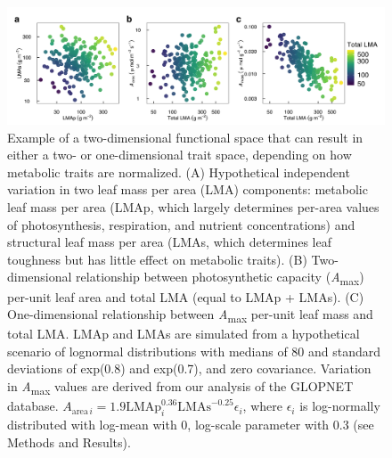 \documentclass[
  12pt,
  a4paper,
,tablecaptionabove
]{scrartcl}
\begin{document}
\begin{figure}
\hypertarget{fig:Hplt}{%
\centering
\includegraphics{../figs/fig_h3.png}
\caption{Example of a two-dimensional functional space that can result in either a two- or one-dimensional trait space, depending on how metabolic traits are normalized. (A) Hypothetical independent variation in two leaf mass per area (LMA) components: metabolic leaf mass per area (LMAp, which largely determines per-area values of photosynthesis, respiration, and nutrient concentrations) and structural leaf mass per area (LMAs, which determines leaf toughness but has little effect on metabolic traits).
(B) Two-dimensional relationship between photosynthetic capacity (\emph{A}\textsubscript{max}) per-unit leaf area and total LMA (equal to LMAp + LMAs).
(C) One-dimensional relationship between \emph{A}\textsubscript{max} per-unit leaf mass and total LMA.
LMAp and LMAs are simulated from a hypothetical scenario of lognormal distributions with medians of 80 and standard deviations of exp(0.8) and exp(0.7), and zero covariance.
Variation in \emph{A}\textsubscript{max} values are derived from our analysis of the GLOPNET database. \(A_{\mathrm{area} \, i}=1.9\mathrm{LMAp}_i^{0.36}\mathrm{LMAs}^{-0.25}\epsilon_i\), where \(\epsilon_i\) is log-normally distributed with log-mean with 0, log-scale parameter with 0.3 (see Methods and Results).}\label{fig:Hplt}
}
\end{figure}
\end{document}
